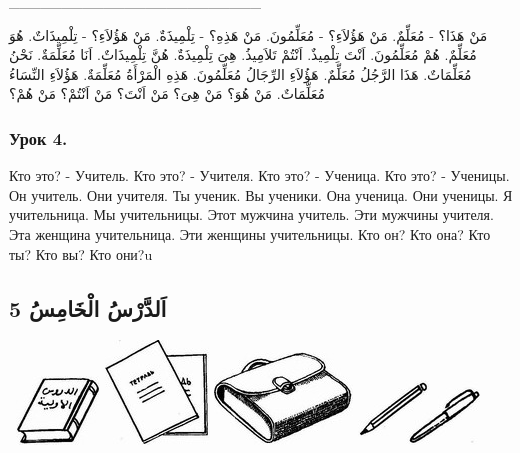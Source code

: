 \documentclass[a5paper]{article}
\begin{document}
\_\_\_\_\_\_\_\_\_\_\_\_\_\_\_\_\_\_\_\_\_\_\_\_

مَنْ هَذَا؟ - مُعَلِّمٌ. مَنْ هَؤُلاَءِ؟ - مُعَلِّمُونَ. مَنْ هَذِهِ؟ - تِلْمِيذَةٌ. مَنْ هَؤُلاَءِ؟ - تِلْمِيذَاتٌ. هُوَ مُعَلِّمٌ. هُمْ مُعَلِّمُونَ. اَنْتَ تِلْمِيذٌ. اَنْتُمْ تَلاَمِيذُ. هِىَ تِلْمِيذَةٌ. هُنَّ تِلْمِيذَاتٌ. اَنَا مُعَلِّمَةٌ. نَحْنُ مُعَلِّمَاتٌ. هَذَا الرَّجُلُ مُعَلِّمٌ. هَؤُلاَءِ الرِّجَالُ مُعَلِّمُونَ. هَذِهِ الْمَرْأَةُ مُعَلِّمَةٌ. هَؤُلاَءِ النِّسَاءُ مُعَلِّمَاتٌ. مَنْ هُوَ؟ مَنْ هِىَ؟ مَنْ اَنْتَ؟ مَنْ اَنْتُمْ؟ مَنْ هُمْ؟

\subsubsection{Урок 4. }
Кто это? - Учитель. Кто это? - Учителя. Кто это? - Ученица. Кто это? - Ученицы. Он учитель. Они учителя. Ты ученик. Вы ученики. Она ученица. Они ученицы. Я учительница. Мы учительницы. Этот мужчина учитель. Эти мужчины учителя. Эта женщина учительница. Эти женщины учительницы. Кто он? Кто она? Кто ты? Кто вы? Кто они?u

\subsection{اَلدَّرْسُ الْخَامِسُ 5}
\  \includegraphics[width=0.8752in,height=0.7189in]{MuhammadBagauddinlatinized-img002.jpg}   \includegraphics[width=1.0937in,height=1.0937in]{MuhammadBagauddinlatinized-img003.jpg}   \includegraphics[width=1.448in,height=0.9689in]{MuhammadBagauddinlatinized-img004.jpg}   \includegraphics[width=1.2709in,height=0.6772in]{MuhammadBagauddinlatinized-img005.jpg} 
\end{document}
